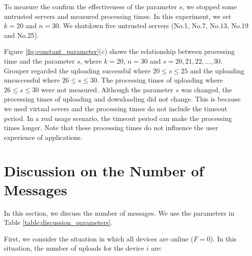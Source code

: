 \documentclass[a4paper,11pt]{report}
\begin{document}
To measure the confirm the effectiveness of the parameter $s$, we stopped some untrusted servers and measured processing times.
In this experiment, we set $k = 20$ and $n = 30$.
We shutdown five untrusted servers (No.1, No.7, No.13, No.19 and No.25).

Figure \ref{fig:constant_parameter}(c) shows the relationship between processing time and the parameter $s$, where $k = 20$, $n = 30$ and $s = 20, 21, 22, ... , 30$.
Grouper regarded the uploading successful where $20 \leq s \leq 25$ and the uploading unsuccessful where $26 \leq s \leq 30$.
The processing times of uploading where $26 \leq s \leq 30$ were not measured.
Although the parameter $s$  was changed, the processing times of uploading and downloading did not change.
This is because we used virtual severs and the processing times do not include the timeout period.
In a real usage scenario, the timeout period can make the processing times longer. 
Note that these processing times do not influence the user experience of applications.

\section{Discussion on the Number of Messages} \label{section:discussion}

In this section, we discuss the number of messages. 
We use the parameters in Table \ref{table:discussion_parameters}.

First, we consider the situation in which all devices are online ($F=0$).
In this situation, the number of uploads for the device $i$ are:
\end{document}
